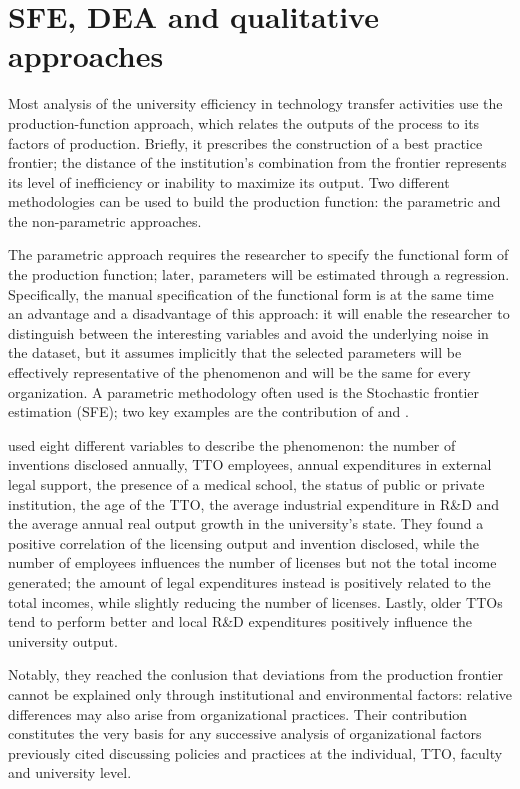 \section{SFE, DEA and qualitative approaches}

Most analysis of the university efficiency in technology transfer activities use the production-function approach, which relates the outputs of the process to its factors of production. Briefly, it prescribes the construction of a best practice frontier; the distance of the institution's combination from the frontier represents its level of inefficiency or inability to maximize its output. Two different methodologies can be used to build the production function: the parametric and the non-parametric approaches.

The parametric approach requires the researcher to specify the functional form of the production function; later, parameters will be estimated through a regression. Specifically, the manual specification of the functional form is at the same time an advantage and a disadvantage of this approach: it will enable the researcher to distinguish between the interesting variables and avoid the underlying noise in the dataset, but it assumes implicitly that the selected parameters will be effectively representative of the phenomenon and will be the same for every organization. A parametric methodology often used is the Stochastic frontier estimation (SFE); two key examples are the contribution of \citet{Siegel2003a} and \citet{Link2005}.

\citet{Siegel2003a} used eight different variables to describe the phenomenon: the number of inventions disclosed annually, TTO employees, annual expenditures in external legal support, the presence of a medical school, the status of public or private institution, the age of the TTO, the average industrial expenditure in R\&D and the average annual real output growth in the university's state. They found a positive correlation of the licensing output and invention disclosed, while the number of employees influences the number of licenses but not the total income generated; the amount of legal expenditures instead is positively related to the total incomes, while slightly reducing the number of licenses. Lastly, older TTOs tend to perform better and local R\&D expenditures positively influence the university output. 

Notably, they reached the conlusion that deviations from the production frontier cannot be explained only through institutional and environmental factors: relative differences may also arise from organizational practices. Their contribution constitutes the very basis for any successive analysis of organizational factors previously cited discussing policies and practices at the individual, TTO, faculty and university level. 

